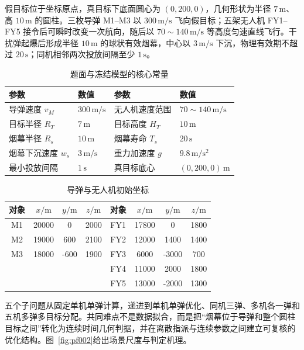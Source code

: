\documentclass[UTF8,a4paper,zihao=-4]{ctexart}
\begin{document}
假目标位于坐标原点，真目标下底面圆心为 \((0,200,0)\)，几何形状为半径 \(7\,\mathrm m\)、高 \(10\,\mathrm m\) 的圆柱。三枚导弹 M1--M3 以 \(300\,\mathrm{m/s}\) 飞向假目标；五架无人机 FY1--FY5 接令后可瞬时改变一次航向，随后以 \(70\sim140\,\mathrm{m/s}\) 等高度匀速直线飞行。干扰弹起爆后形成半径 \(10\,\mathrm m\) 的球状有效烟幕，中心以 \(3\,\mathrm{m/s}\) 下沉，物理有效期不超过 \(20\,\mathrm s\)；同机相邻两次投放间隔至少 \(1\,\mathrm s\)。

\begin{table}[H]
\centering
\caption{题面与冻结模型的核心常量}
\label{tab:constants}
\small
\begin{tabularx}{0.96\textwidth}{lYlY}
\toprule
参数 & 数值 & 参数 & 数值 \\
\midrule
导弹速度 \(v_M\) & \(300\,\mathrm{m/s}\) &
无人机速度范围 & \(70\sim140\,\mathrm{m/s}\) \\
目标半径 \(R_T\) & \(7\,\mathrm m\) &
目标高度 \(H_T\) & \(10\,\mathrm m\) \\
烟幕半径 \(R_s\) & \(10\,\mathrm m\) &
烟幕寿命 \(T_s\) & \(20\,\mathrm s\) \\
烟幕下沉速度 \(w_s\) & \(3\,\mathrm{m/s}\) &
重力加速度 \(g\) & \(9.8\,\mathrm{m/s^2}\) \\
最小投放间隔 & \(1\,\mathrm s\) &
真目标底心 & \((0,200,0)\,\mathrm m\) \\
\bottomrule
\end{tabularx}
\end{table}

\begin{table}[H]
\centering
\caption{导弹与无人机初始坐标}
\label{tab:initial-position}
\small
\begin{tabular}{cccc@{\qquad}cccc}
\toprule
对象 & \(x/\mathrm m\) & \(y/\mathrm m\) & \(z/\mathrm m\) &
对象 & \(x/\mathrm m\) & \(y/\mathrm m\) & \(z/\mathrm m\) \\
\midrule
M1  & 20000 & 0     & 2000 & FY1 & 17800 & 0     & 1800 \\
M2  & 19000 & 600   & 2100 & FY2 & 12000 & 1400  & 1400 \\
M3  & 18000 & -600  & 1900 & FY3 & 6000  & -3000 & 700  \\
    &       &       &      & FY4 & 11000 & 2000  & 1800 \\
    &       &       &      & FY5 & 13000 & -2000 & 1300 \\
\bottomrule
\end{tabular}
\end{table}

五个子问题从固定单机单弹计算，递进到单机单弹优化、同机三弹、多机各一弹和五机多弹多目标分配。共同难点不是数据拟合，而是把“烟幕位于导弹和整个圆柱目标之间”转化为连续时间几何判据，并在离散指派与连续参数之间建立可复核的优化结构。图~\ref{fig:pf002}给出场景尺度与判定机理。
\end{document}
